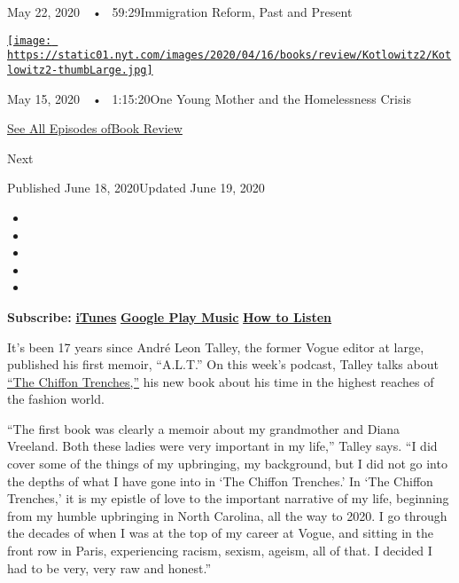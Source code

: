May 22, 2020~~•~ 59:29Immigration Reform, Past and Present

\href{https://www.nytimes.com/2020/05/15/books/review/podcast-lauren-sandler-this-is-all-i-got-sarah-weinman-crime-fiction.html?action=click\&module=audio-series-bar\&region=header\&pgtype=Article}{\texttt{[image: https://static01.nyt.com/images/2020/04/16/books/review/Kotlowitz2/Kotlowitz2-thumbLarge.jpg]}}

May 15, 2020~~•~ 1:15:20One Young Mother and the Homelessness Crisis

\href{https://www.nytimes.com/column/book-review-podcast}{See All
Episodes ofBook Review}

Next

Published June 18, 2020Updated June 19, 2020

\begin{itemize}
\item
\item
\item
\item
\item
\end{itemize}

\textbf{Subscribe:}
\textbf{\href{https://itunes.apple.com/us/podcast/book-review/id120315179?mt=2}{iTunes}}
\textbf{\textbar{}}
\textbf{\href{https://play.google.com/music/listen?u=0\#/ps/Iv6zeb5qwjtzjfbyo3vy5zny5ky}{Google
Play Music}} \textbf{\textbar{}}
\textbf{\href{https://www.nytimes.com/2018/08/03/books/review/how-to-listen-to-the-book-review-podcast.html}{How
to Listen}}

It's been 17 years since André Leon Talley, the former Vogue editor at
large, published his first memoir, ``A.L.T.'' On this week's podcast,
Talley talks about
\href{https://www.nytimes.com/2020/05/15/books/review/the-chiffon-trenches-andre-leon-talley.html}{``The
Chiffon Trenches,''} his new book about his time in the highest reaches
of the fashion world.

``The first book was clearly a memoir about my grandmother and Diana
Vreeland. Both these ladies were very important in my life,'' Talley
says. ``I did cover some of the things of my upbringing, my background,
but I did not go into the depths of what I have gone into in `The
Chiffon Trenches.' In `The Chiffon Trenches,' it is my epistle of love
to the important narrative of my life, beginning from my humble
upbringing in North Carolina, all the way to 2020. I go through the
decades of when I was at the top of my career at Vogue, and sitting in
the front row in Paris, experiencing racism, sexism, ageism, all of
that. I decided I had to be very, very raw and honest.''


